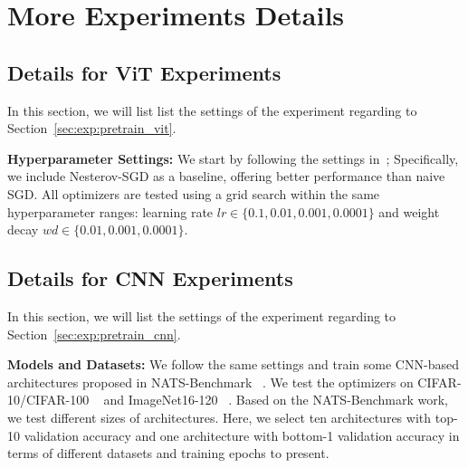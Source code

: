 \newpage
\appendix


\section{More Experiments Details}

\subsection{Details for ViT Experiments}\label{sec:sup:vit_gs_details}
In this section, we will list list the settings of the experiment regarding to Section~\ref{sec:exp:pretrain_vit}.

\textbf{Hyperparameter Settings:} We start by following the settings in~\cite{beyer2022betterplainvitbaselines, steiner2022trainvitdataaugmentation, big_vision};  Specifically, we include Nesterov-SGD as a baseline, offering better performance than naive SGD. All optimizers are tested using a grid search within the same hyperparameter ranges: learning rate \( lr \in \{0.1, 0.01, 0.001, 0.0001\} \) and weight decay \( wd \in \{0.01, 0.001, 0.0001\} \).


\subsection{Details for CNN Experiments}\label{see:sup:cnn_gs_details}
In this section, we will list the settings of the experiment regarding to Section~\ref{sec:exp:pretrain_cnn}.

\textbf{Models and Datasets:}  We follow the same settings and train some CNN-based architectures proposed in NATS-Benchmark ~\cite{dong2021nats}. We test the optimizers on CIFAR-10/CIFAR-100 ~\cite{krizhevsky2009learning} and ImageNet16-120 ~\cite{chrabaszcz2017downsampled}. Based on the NATS-Benchmark work, we test different sizes of architectures. Here, we select ten architectures with top-10 validation accuracy and one architecture with bottom-1 validation accuracy in terms of different datasets and training epochs to present. 

